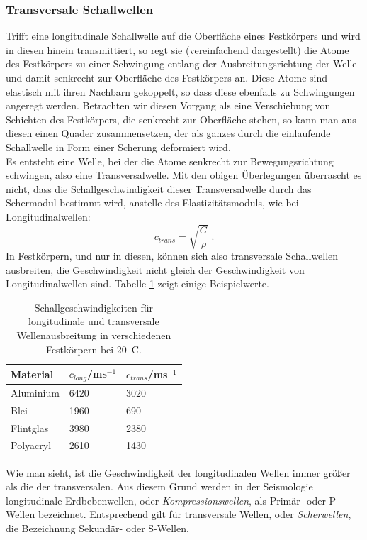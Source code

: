 \subsubsection{Transversale Schallwellen}

Trifft eine longitudinale Schallwelle auf die Oberfläche eines Festkörpers und wird in diesen hinein transmittiert, so regt sie (vereinfachend dargestellt) die Atome des Festkörpers zu einer Schwingung entlang der Ausbreitungsrichtung der Welle und damit senkrecht zur Oberfläche des Festkörpers an. Diese Atome sind elastisch mit ihren Nachbarn gekoppelt, so dass diese ebenfalls zu Schwingungen angeregt werden. Betrachten wir diesen Vorgang als eine Verschiebung von Schichten des Festkörpers, die senkrecht zur Oberfläche stehen, so kann man aus diesen einen Quader zusammensetzen, der als ganzes durch die einlaufende Schallwelle in Form einer Scherung deformiert wird. \\
Es entsteht eine Welle, bei der die Atome senkrecht zur Bewegungsrichtung schwingen, also eine Transversalwelle. Mit den obigen Überlegungen überrascht es nicht, dass die Schallgeschwindigkeit dieser Transversalwelle durch das Schermodul bestimmt wird, anstelle des Elastizitätsmoduls, wie bei Longitudinalwellen:
\begin{equation}
	c_{trans} = \sqrt{\frac{G}{\rho}}\; .
\end{equation}
In Festkörpern, und nur in diesen, können sich also transversale Schallwellen ausbreiten, die Geschwindigkeit nicht gleich der Geschwindigkeit von Longitudinalwellen sind. Tabelle \ref{tab:Schallgeschwindigkeiten} zeigt einige Beispielwerte.

\begin{table}[hb]
	\centering
		\begin{tabular}{l|l|l}
			Material & $c_{long}$/ms$^{-1}$ & $c_{trans}$/ms$^{-1}$ \\
			\hline
			Aluminium & 6420 & 3020\\
			Blei & 1960 & 690\\
			Flintglas & 3980 & 2380\\
			Polyacryl & 2610 & 1430\\
		\end{tabular}
	\caption{Schallgeschwindigkeiten für longitudinale und transversale Wellenausbreitung in verschiedenen Festkörpern bei 20\degree~C.}
	\label{tab:Schallgeschwindigkeiten}
\end{table}

Wie man sieht, ist die Geschwindigkeit der longitudinalen Wellen immer größer als die der transversalen. Aus diesem Grund werden in der Seismologie longitudinale Erdbebenwellen, oder \textit{Kompressionswellen}, als Primär- oder P-Wellen bezeichnet. Entsprechend gilt für transversale Wellen, oder \textit{Scherwellen}, die Bezeichnung Sekundär- oder S-Wellen.\\

